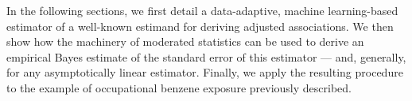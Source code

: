 In the following sections, we first detail a data-adaptive, machine
learning-based estimator of a well-known estimand for deriving adjusted
associations. We then show how the machinery of moderated statistics can be used
to derive an empirical Bayes estimate of the standard error of this estimator
--- and, generally, for any asymptotically linear estimator. Finally, we apply
the resulting procedure to the example of occupational benzene exposure
previously described.
